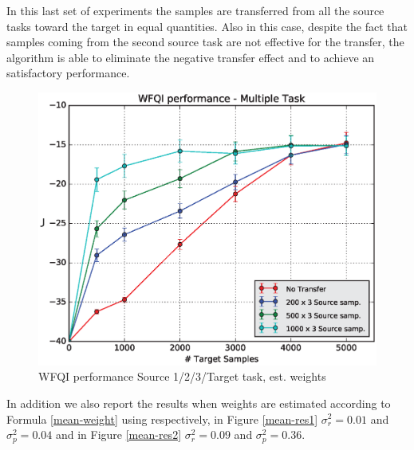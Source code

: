     \noindent In this last set of experiments the samples are transferred from all
    the source tasks toward the target in equal quantities. Also in this case,
    despite the fact that samples coming from the second source task
    are not effective for the transfer, the algorithm is able to eliminate the negative
    transfer effect and to achieve an satisfactory performance.

    \begin{figure}[H]
      \raggedbottom
      \centering
      \includegraphics[scale=0.5]{images/WFQIPerfM_V2.eps}
      \caption{WFQI performance Source 1/2/3/Target task, est. weights}
      \label{perfMV2}
    \end{figure}

    \noindent In addition we also report the results when weights are estimated according to
    Formula \ref{mean-weight} using respectively, in Figure \ref{mean-res1} $\sigma^{2}_r = 0.01$ and
    $\sigma^{2}_{p} = 0.04$ and in Figure \ref{mean-res2} $\sigma^{2}_{r} = 0.09$ and $\sigma^{2}_{p} = 0.36$.

